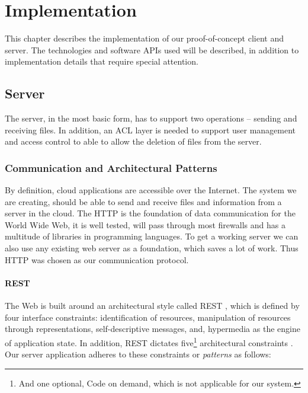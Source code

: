 \documentclass[pdftex,english,10pt,b5paper,twoside]{book}
\begin{document}
\chapter{Implementation}
This chapter describes the implementation of our proof-of-concept client and
server. The technologies and software \ac{API}s used will be described, in
addition to implementation details that require special attention.

\section{Server}

The server, in the most basic form, has to support two operations -- sending
and receiving files. In addition, an \ac{ACL} layer is needed to support user
management and access control to able to allow the deletion of files from the
server.

\subsection{Communication and Architectural Patterns}

By definition, cloud applications are accessible over the Internet. The system
we are creating, should be able to send and receive files and information from
a server in the cloud. The \acf{HTTP} is the foundation of data communication
for the World Wide Web, it is well tested, will pass through most firewalls and
has a multitude of libraries in programming languages. To get a working server
we can also use any existing web server as a foundation, which saves a lot of
work. Thus \ac{HTTP} was chosen as our communication protocol.

\subsubsection{\acs{REST}} The Web is built around an architectural style called
\ac{REST} \cite[ch. 5]{fielding}, which is defined by four interface
constraints: identification of resources, manipulation of resources through
representations, self-descriptive messages, and, hypermedia as the engine of
application state. In addition, \ac{REST} dictates five\footnote{And one
optional, Code on demand, which is not applicable for our system.} architectural
constraints \cite{fielding}. Our server application adheres to these
constraints or \emph{patterns} as follows:
\end{document}
